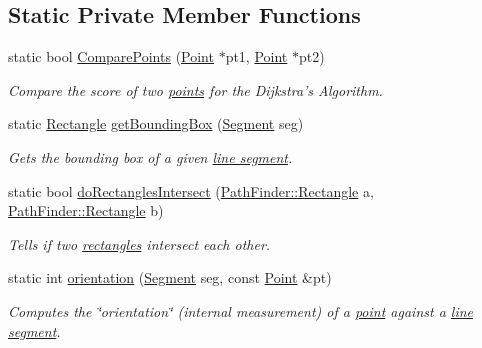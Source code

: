 \subsection*{Static Private Member Functions}
\begin{DoxyCompactItemize}
\item 
static bool \hyperlink{classPathFinder_a35649ba9507af0f7c450932ae92a149f}{ComparePoints} (\hyperlink{structPathFinder_1_1Point}{Point} $\ast$pt1, \hyperlink{structPathFinder_1_1Point}{Point} $\ast$pt2)
\begin{DoxyCompactList}\small\item\em Compare the score of two \hyperlink{structPathFinder_1_1Point}{points} for the Dijkstra's Algorithm. \item\end{DoxyCompactList}\item 
static \hyperlink{structPathFinder_1_1Rectangle}{Rectangle} \hyperlink{classPathFinder_aff7a6dc34e3075686230ac4c64632c38}{getBoundingBox} (\hyperlink{structPathFinder_1_1Segment}{Segment} seg)
\begin{DoxyCompactList}\small\item\em Gets the bounding box of a given \hyperlink{structPathFinder_1_1Segment}{line segment}. \item\end{DoxyCompactList}\item 
static bool \hyperlink{classPathFinder_af0e8090b3bb9516751093f99a7376453}{doRectanglesIntersect} (\hyperlink{structPathFinder_1_1Rectangle}{PathFinder::Rectangle} a, \hyperlink{structPathFinder_1_1Rectangle}{PathFinder::Rectangle} b)
\begin{DoxyCompactList}\small\item\em Tells if two \hyperlink{structPathFinder_1_1Rectangle}{rectangles} intersect each other. \item\end{DoxyCompactList}\item 
static int \hyperlink{classPathFinder_a00ffa1d61e4ecdb8238d462c584f4007}{orientation} (\hyperlink{structPathFinder_1_1Segment}{Segment} seg, const \hyperlink{structPathFinder_1_1Point}{Point} \&pt)
\begin{DoxyCompactList}\small\item\em Computes the \char`\"{}orientation\char`\"{} (internal measurement) of a \hyperlink{structPathFinder_1_1Point}{point} against a \hyperlink{structPathFinder_1_1Segment}{line segment}. \item\end{DoxyCompactList}\item 

\end{DoxyCompactItemize}
